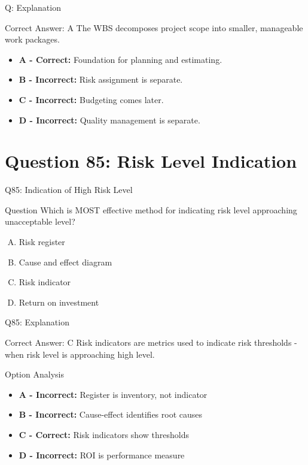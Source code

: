 \documentclass{beamer}
\begin{document}
	\begin{frame}{Q: Explanation}
		\begin{block}{Correct Answer: A}
			The WBS decomposes project scope into smaller,
			manageable work packages.
		\end{block}
		
		\begin{itemize}
			\item \textbf{A - Correct:} Foundation for planning and estimating.
			\item \textbf{B - Incorrect:} Risk assignment is separate.
			\item \textbf{C - Incorrect:} Budgeting comes later.
			\item \textbf{D - Incorrect:} Quality management is separate.
		\end{itemize}
	\end{frame}
	
	\section{Question 85: Risk Level Indication}
	
	\begin{frame}{Q85: Indication of High Risk Level}
		\begin{block}{Question}
			Which is MOST effective method for indicating risk level approaching unacceptable level?
		\end{block}
		\begin{enumerate}[(A)]
			\item Risk register
			\item Cause and effect diagram
			\item Risk indicator
			\item Return on investment
		\end{enumerate}
	\end{frame}
	
	\begin{frame}{Q85: Explanation}
		\begin{block}{Correct Answer: C}
			Risk indicators are metrics used to indicate risk thresholds - when risk level is approaching high level.
		\end{block}
		\begin{block}{Option Analysis}
			\begin{itemize}
				\item \textbf{A - Incorrect:} Register is inventory, not indicator
				\item \textbf{B - Incorrect:} Cause-effect identifies root causes
				\item \textbf{C - Correct:} Risk indicators show thresholds
				\item \textbf{D - Incorrect:} ROI is performance measure
			\end{itemize}
		\end{block}
	\end{frame}
	
\end{document}
